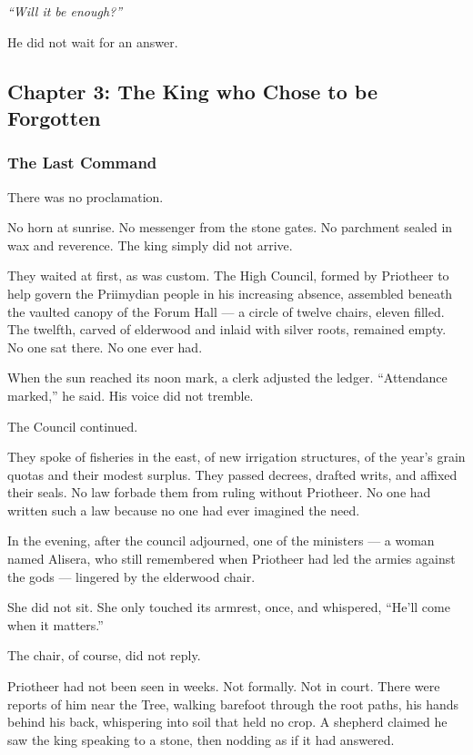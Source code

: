 \documentclass[12pt]{article}
\begin{document}
\vspace{0.5em}
\textit{``Will it be enough?''}

\vspace{0.5em}
He did not wait for an answer.


\newpage

\subsection*{Chapter 3: The King who Chose to be Forgotten}

\vspace{.5in}

\subsubsection*{The Last Command}

There was no proclamation.

No horn at sunrise. No messenger from the stone gates. No parchment sealed in wax and reverence. The king simply did not arrive.

They waited at first, as was custom. The High Council, formed by Priotheer to help govern the Priimydian people in his increasing absence, assembled beneath the vaulted canopy of the Forum Hall — a circle of twelve chairs, eleven filled. The twelfth, carved of elderwood and inlaid with silver roots, remained empty. No one sat there. No one ever had.

When the sun reached its noon mark, a clerk adjusted the ledger. “Attendance marked,” he said. His voice did not tremble.

The Council continued.

They spoke of fisheries in the east, of new irrigation structures, of the year’s grain quotas and their modest surplus. They passed decrees, drafted writs, and affixed their seals. No law forbade them from ruling without Priotheer. No one had written such a law because no one had ever imagined the need.

In the evening, after the council adjourned, one of the ministers — a woman named Alisera, who still remembered when Priotheer had led the armies against the gods — lingered by the elderwood chair.

She did not sit. She only touched its armrest, once, and whispered, “He’ll come when it matters.”

The chair, of course, did not reply.

Priotheer had not been seen in weeks. Not formally. Not in court. There were reports of him near the Tree, walking barefoot through the root paths, his hands behind his back, whispering into soil that held no crop. A shepherd claimed he saw the king speaking to a stone, then nodding as if it had answered.
\end{document}
